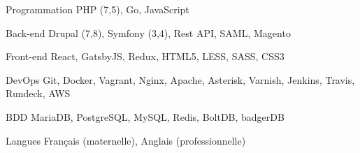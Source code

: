

\begin{cvskills}

  \cvskill
    {Programmation} %
    {PHP (7,5), Go, JavaScript} %

  \cvskill
    {Back-end} %
    {Drupal (7,8), Symfony (3,4), Rest API, SAML, Magento} %

  \cvskill
    {Front-end} %
    {React, GatsbyJS, Redux, HTML5, LESS, SASS, CSS3} %

  \cvskill
    {DevOps} %
    {Git, Docker, Vagrant, Nginx, Apache, Asterisk, Varnish, Jenkins, Travis, Rundeck, AWS} %

  \cvskill
    {BDD} %
    {MariaDB, PostgreSQL, MySQL, Redis, BoltDB, badgerDB} %

  \cvskill
    {Langues} %
    {Français (maternelle), Anglais (professionnelle)} %

\end{cvskills}
